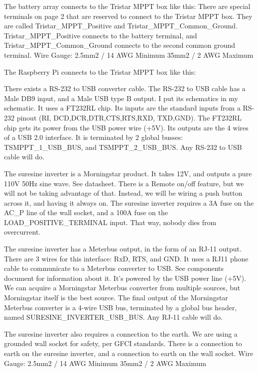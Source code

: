 The battery array connects to the Tristar MPPT box like this:
There are special terminals on page 2 that are reserved to connect to the Tristar MPPT box. They are called Tristar\_MPPT\_Positive and Tristar\_MPPT\_Common\_Ground. Tristar\_MPPT\_Positive connects to the battery terminal, and Tristar\_MPPT\_Common\_Ground connects to the second common ground terminal.
\newline
Wire Gauge: 
2.5mm2 / 14 AWG Minimum
35mm2 / 2 AWG Maximum 

The Raspberry Pi connects to the Tristar MPPT box like this:

There exists a RS-232 to USB converter cable. The RS-232 to USB cable has a Male DB9 input, and a Male USB type B output. I put its schematics in my schematic. It uses a FT232RL chip. Its inputs are the standard inputs from a RS-232 pinout (RI, DCD,DCR,DTR,CTS,RTS,RXD, TXD,GND). The FT232RL chip gets its power from the USB power wire (+5V). Its outputs are the 4 wires of a USB 2.0 interface. It is terminated by 2 global busses: TSMPPT\_1\_USB\_BUS, and TSMPPT\_2\_USB\_BUS.
\newline
Any RS-232 to USB cable will do.

The suresine inverter is a Morningstar product. It takes 12V, and outputs a pure 110V 50Hz sine wave. See datasheet. There is a Remote on/off feature, but we will not be taking advantage of that. Instead, we will be wiring a push button across it, and having it always on.
The suresine inverter requires a 3A fuse on the AC\_P line of the wall socket, and a 100A fuse on the LOAD\_POSITIVE\_TERMINAL input. That way, nobody dies from overcurrent. 

The suresine inverter has a Meterbus output, in the form of an RJ-11 output. There are 3 wires for this interface: RxD, RTS, and GND. It uses a RJ11 phone cable to communicate to a Meterbus converter to USB. See components document for information about it. It’s powered by the USB power line (+5V). We can acquire a Morningstar Meterbus converter from multiple sources, but Morningstar itself is the best source. The final output of the Morningstar Meterbus converter is a 4-wire USB bus, terminated by a global bus header, named SURESINE\_INVERTER\_USB\_BUS.
\newline
Any RJ-11 cable will do.

The suresine inverter also requires a connection to the earth. We are using a grounded wall socket for safety, per GFCI standards. There is a connection to earth on the suresine inverter, and a connection to earth on the wall socket. 
\newline
Wire Gauge: 
2.5mm2 / 14 AWG Minimum
35mm2 / 2 AWG Maximum 

